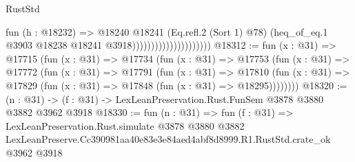 \begin{lexlean}{RustStd}
\begin{coremodule}
                                          fun (h : @18232) =>
                                          @18240
                                            @18241
                                            (Eq.refl.{2} (Sort 1) @78)
                                            (heq_of_eq.{1}
                                              @3903
                                              @18238
                                              @18241
                                              @3918)))))))))))))))))))))
@18312 := fun (x : @31) =>
  @17715
    (fun (x : @31) =>
    @17734
      (fun (x : @31) =>
      @17753
        (fun (x : @31) =>
        @17772
          (fun (x : @31) =>
          @17791
            (fun (x : @31) =>
            @17810
              (fun (x : @31) => @17829 (fun (x : @31) => @17848 (fun (x : @31) => @18295))))))))
@18320 := (n : @31) -> (f : @31) -> LexLeanPreservation.Rust.FunSem @3878 @3880 @3882 @3962 @3918
@18330 := fun (n : @31) =>
  fun (f : @31) =>
  LexLeanPreservation.Rust.simulate
    @3878
    @3880
    @3882
    LexLeanPreserve.Cc390981aa40e83e3e84aed4abf8d8999.R1.RustStd.crate_ok
    @3962
    @3918
\end{coremodule}
\end{lexlean}
